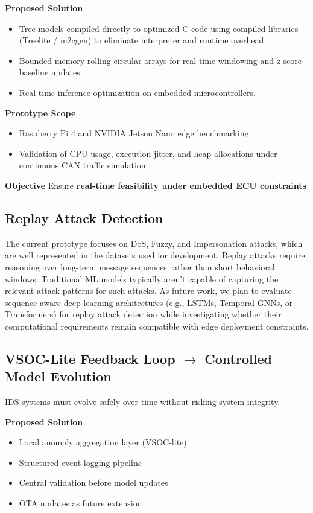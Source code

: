 \documentclass{article}
\begin{document}
\textbf{Proposed Solution}
\begin{itemize}[noitemsep]
    \item Tree models compiled directly to optimized C code using compiled libraries (Treelite / m2cgen) to eliminate interpreter and runtime overhead.
    \item Bounded-memory rolling circular arrays for real-time windowing and z-score baseline updates.
    \item Real-time inference optimization on embedded microcontrollers.
\end{itemize}

\textbf{Prototype Scope}
\begin{itemize}[noitemsep]
    \item Raspberry Pi 4 and NVIDIA Jetson Nano edge benchmarking.
    \item Validation of CPU usage, execution jitter, and heap allocations under continuous CAN traffic simulation.
\end{itemize}

\textbf{Objective}
Ensure \textbf{real-time feasibility under embedded ECU constraints}

\subsection{Replay Attack Detection}
The current prototype focuses on DoS, Fuzzy, and Impersonation attacks, which are well represented in the datasets used for development. Replay attacks require reasoning over long-term message sequences rather than short behavioral windows. Traditional ML models typically aren't capable of capturing the relevant attack patterns for such attacks. As future work, we plan to evaluate sequence-aware deep learning architectures (e.g., LSTMs, Temporal GNNs, or Transformers) for replay attack detection while investigating whether their computational requirements remain compatible with edge deployment constraints.

\subsection{VSOC-Lite Feedback Loop $\rightarrow$ Controlled Model Evolution}
IDS systems must evolve safely over time without risking system integrity.

\textbf{Proposed Solution}
\begin{itemize}[noitemsep]
    \item Local anomaly aggregation layer (VSOC-lite)
    \item Structured event logging pipeline
    \item Central validation before model updates
    \item OTA updates as future extension
\end{itemize}
\end{document}

